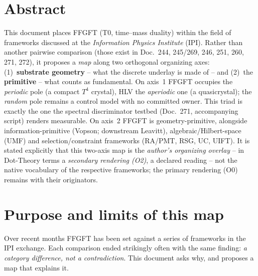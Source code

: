 
\section*{Abstract}
This document places FFGFT (T0, time--mass duality) within the field of frameworks discussed at
the \emph{Information Physics Institute} (IPI). Rather than another pairwise comparison (those exist
in Doc.~244, 245/269, 246, 251, 260, 271, 272), it proposes a \emph{map} along two orthogonal
organizing axes: (1)~\textbf{substrate geometry} -- what the discrete underlay is made of -- and
(2)~the \textbf{primitive} -- what counts as fundamental. On axis~1 FFGFT occupies the
\emph{periodic} pole (a compact $T^4$ crystal), HLV the \emph{aperiodic} one (a quasicrystal);
the \emph{random} pole remains a control model with no committed owner. This triad is exactly the
one the spectral discriminator testbed (Doc.~271, accompanying script) renders measurable. On
axis~2 FFGFT is geometry-primitive, alongside information-primitive (Vopson; downstream Leavitt),
algebraic/Hilbert-space (UMF) and selection/constraint frameworks (RA/PMT, RSG, UC, UIFT). It is
stated explicitly that this two-axis map is the \emph{author's organizing overlay} -- in
Dot-Theory terms a \emph{secondary rendering (O2)}, a declared reading -- not the native vocabulary
of the respective frameworks; the primary rendering (O0) remains with their originators.

\section{Purpose and limits of this map}

Over recent months FFGFT has been set against a series of frameworks in the IPI exchange. Each
comparison ended strikingly often with the same finding: \emph{a category difference, not a
contradiction}. This document asks why, and proposes a map that explains it.

